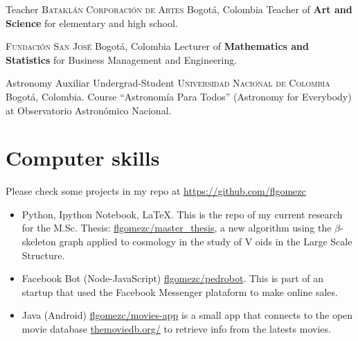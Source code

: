 \documentclass[12pt,letterpaper,sans]{moderncv}
\begin{document}
        {Teacher}
        {\textsc{Batakl\'an Corporaci\'on de Artes}}
        {Bogot\'a, Colombia}{}
        {Teacher of \textbf{Art and Science} for elementary and high school.}

        {\textsc{Fundaci\'on San Jos\'e}}
        {Bogot\'a, Colombia}{}
        {Lecturer of \textbf{Mathematics and Statistics} for Business Management and Engineering.}


{Astronomy Auxiliar Undergrad-Student}
{\textsc{Universidad Nacional de Colombia}}
{Bogot\'a, Colombia.}{}
{Course ``Astronom\'ia Para Todos'' (Astronomy for Everybody) at Observatorio 
Astron\'omico Nacional.}


\section{Computer skills}

Please check some projects in my repo at \url{https://github.com/flgomezc}
\medskip

\begin{itemize}
\item Python, Ipython Notebook, \LaTeX. This is the repo of my current research for
  the M.Sc. Thesis: \href{https://github.com/flgomezc/master_thesis}{flgomezc/master\_thesis},
  a new algorithm using the $\beta$-skeleton graph applied to cosmology in the study of V
  oids in the Large Scale Structure.

\item Facebook Bot (Node-JavaScript) \href{https://github.com/flgomezc/pedrobot}
  {flgomezc/pedrobot}. This is part of an startup that used the Facebook Messenger
  plataform to make online sales.
  
\item Java (Android) \href{https://github.com/flgomezc/movies-app}{flgomezc/movies-app}
  is a small app that connects to the open movie database \href{https://www.themoviedb.org/}
  {themoviedb.org/} to retrieve info from the latests movies.

\end{itemize}

\medskip
\end{document}
